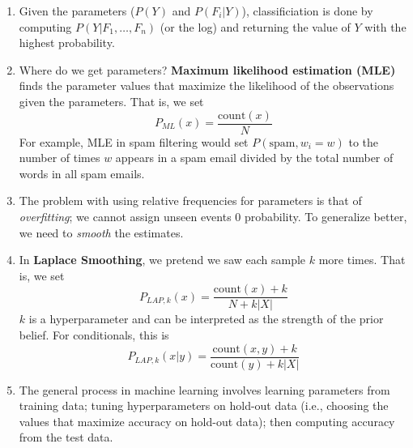 \documentclass[10pt]{article}
\begin{document}
\begin{multicols}{2}
\begin{enumerate}
\begin{enumerate}
        \item Given the parameters ($P(Y)$ and $P(F_i|Y)$), classificiation is done by computing $P(Y|F_1,\ldots,F_n)$ (or the log) and returning the value of $Y$ with the highest probability. 
        \item Where do we get parameters? \textbf{Maximum likelihood estimation (MLE)} finds the parameter values that maximize the likelihood of the observations given the parameters. That is, we set $$P_{ML}(x) = \frac{\text{count}(x)}{N}$$ For example, MLE in spam filtering would set $P(\text{spam}, w_i=w)$ to the number of times $w$ appears in a spam email divided by the total number of words in all spam emails.
        \item The problem with using relative frequencies for parameters is that of \textit{overfitting}; we cannot assign unseen events 0 probability. To generalize better, we need to \textit{smooth} the estimates. 
        \item In \textbf{Laplace Smoothing}, we pretend we saw each sample $k$ more times. That is, we set
        $$P_{LAP,k}(x) = \frac{\text{count}(x)+k}{N+k|X|}$$
        $k$ is a hyperparameter and can be interpreted as the strength of the prior belief. For conditionals, this is
        $$P_{LAP,k}(x|y) = \frac{\text{count}(x,y)+k}{\text{count}(y)+k|X|}$$
        \item The general process in machine learning involves learning parameters from training data; tuning hyperparameters on hold-out data (i.e., choosing the values that maximize accuracy on hold-out data); then computing accuracy from the test data.
        
    \end{enumerate}

\end{enumerate}
\end{multicols}
\end{document}
